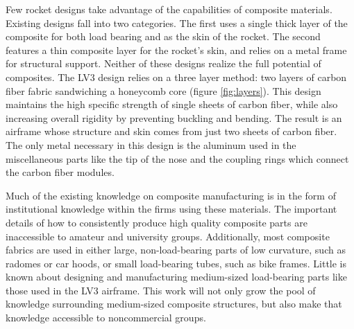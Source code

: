 \documentclass{aiaa-tc}%
\begin{document}
Few rocket designs take advantage of the capabilities of composite materials. Existing designs fall into two categories. The first uses a single thick layer of the composite for both load bearing and as the skin of the rocket. The second features a thin composite layer for the rocket's skin, and relies on a metal frame for structural support. 
Neither of these designs realize the full potential of composites. The LV3 design relies on a three layer method: two layers of carbon fiber fabric sandwiching a honeycomb core (figure \ref{fig:layers}). This design maintains the high specific strength of single sheets of carbon fiber, while also increasing overall rigidity by preventing buckling and bending. 
The result is an airframe whose structure and skin comes from just two sheets of carbon fiber. The only metal necessary in this design is the aluminum used in the miscellaneous parts like the tip of the nose and the coupling rings which connect the carbon fiber modules. 

Much of the existing knowledge on composite manufacturing is in the form of institutional knowledge within the firms using these materials. The important details of how to consistently produce high quality composite parts are inaccessible to amateur and university groups. 
Additionally, most composite fabrics are used in either large, non-load-bearing parts of low curvature, such as radomes or car hoods, or small load-bearing tubes, such as bike frames. Little is known about designing and manufacturing medium-sized load-bearing parts like those used in the LV3 airframe. This work will not only grow the pool of knowledge surrounding medium-sized composite structures, but also make that knowledge accessible to noncommercial groups. 

\end{document}
